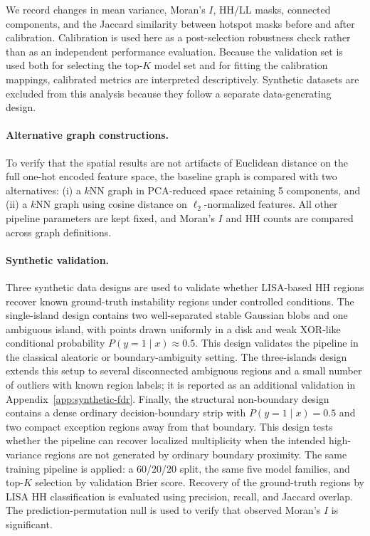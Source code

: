 We record changes in mean variance, Moran's $I$, HH/LL masks, connected components,
and the Jaccard similarity between hotspot masks before and after calibration. Calibration
is used here as a post-selection robustness check rather than as an independent
performance evaluation. Because the validation set is used both for selecting the top-$K$
model set and for fitting the calibration mappings, calibrated metrics are interpreted
descriptively. Synthetic datasets are excluded from this analysis because they follow a
separate data-generating design.

\paragraph{Alternative graph constructions.}
To verify that the spatial results are not artifacts of Euclidean distance on the full
one-hot encoded feature space, the baseline graph is compared with two alternatives:
(i) a $k$NN graph in PCA-reduced space retaining 5 components, and (ii) a $k$NN graph
using cosine distance on $\ell_2$-normalized features. All other pipeline parameters are
kept fixed, and Moran's $I$ and HH counts are compared across graph definitions.

\paragraph{Synthetic validation.}
Three synthetic data designs are used to validate whether LISA-based HH regions recover
known ground-truth instability regions under controlled conditions. The single-island
design contains two well-separated stable Gaussian blobs and one ambiguous island, with
points drawn uniformly in a disk and weak XOR-like conditional probability
$P(y = 1 \mid x) \approx 0.5$. This design validates the pipeline in the classical
aleatoric or boundary-ambiguity setting. The three-islands design extends this setup to
several disconnected ambiguous regions and a small number of outliers with known region
labels; it is reported as an additional validation in Appendix~\ref{app:synthetic-fdr}.
Finally, the structural non-boundary design contains a dense ordinary decision-boundary
strip with $P(y=1\mid x)=0.5$ and two compact exception regions away from that
boundary. This design tests whether the pipeline can recover localized multiplicity when
the intended high-variance regions are not generated by ordinary boundary proximity.
The same training pipeline is applied: a 60/20/20 split, the same five model families,
and top-$K$ selection by validation Brier score. Recovery of the ground-truth regions by
LISA HH classification is evaluated using precision, recall, and Jaccard overlap. The
prediction-permutation null is used to verify that observed Moran's $I$ is significant.

